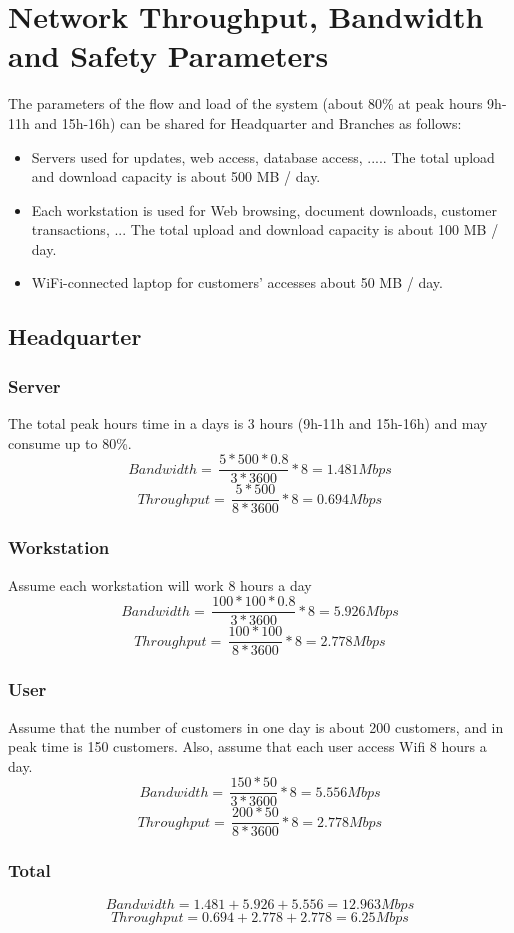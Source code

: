 \section{Network Throughput, Bandwidth and Safety Parameters}
The parameters of the flow and load of the system (about 80\% at peak hours 9h-11h and 15h-16h) can be shared for Headquarter and Branches as follows:
\begin{itemize}
  \item Servers used for updates, web access, database access, ..... The total upload and download capacity is about 500 MB / day.
  \item Each workstation is used for Web browsing, document downloads, customer transactions, ... The total upload and download capacity is about 100 MB / day.
  \item WiFi-connected laptop for customers’ accesses about 50 MB / day.
\end{itemize}

\subsection{Headquarter}
\subsubsection{Server}
The total peak hours time in a days is 3 hours (9h-11h and 15h-16h) and may consume up to 80\%. \\
$$Bandwidth = \, \frac{5*500*0.8}{3*3600}*8 = 1.481Mbps$$
$$Throughput = \, \frac{5*500}{8*3600}*8 = 0.694Mbps$$
\subsubsection{Workstation}
Assume each workstation will work 8 hours a day
$$Bandwidth = \, \frac{100*100*0.8}{3*3600}*8 = 5.926Mbps$$
$$Throughput = \, \frac{100*100}{8*3600}*8 = 2.778Mbps$$
\subsubsection{User}
Assume that the number of customers in one day is about 200 customers, and in peak
time is 150 customers. Also, assume that each user access Wifi 8 hours a day.
$$Bandwidth = \, \frac{150*50}{3*3600}*8 = 5.556Mbps$$
$$Throughput = \, \frac{200*50}{8*3600}*8 = 2.778Mbps$$

\subsubsection{Total}
$$Bandwidth = 1.481+5.926+5.556 = 12.963Mbps$$
$$Throughput = 0.694+2.778+2.778 = 6.25Mbps$$

